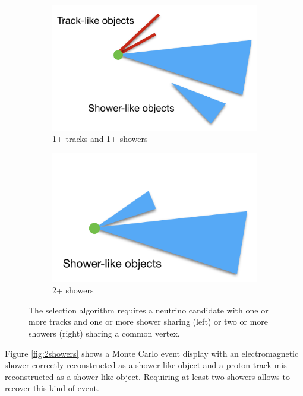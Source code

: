 \documentclass[a4paper]{article}
\begin{document}
\begin{figure}
\centering
  \begin{subfigure}{0.4\textwidth}
    \includegraphics[width=\linewidth]{figures/trsh.png}
    \caption{1+ tracks and 1+ showers} 
  \end{subfigure}
    \begin{subfigure}{0.4\textwidth}
    \includegraphics[width=\linewidth]{figures/sh.png}
    \caption{2+ showers} 
  \end{subfigure}
  \caption{The selection algorithm requires a neutrino candidate with one or more tracks and one or more shower sharing (left) or two or more showers (right) sharing  a common vertex.}\label{fig:dia}
\end{figure}

Figure \ref{fig:2showers} shows a Monte Carlo event display with an electromagnetic shower correctly reconstructed as a shower-like object and a proton track mis-reconstructed as a shower-like object. Requiring at least two showers allows to recover this kind of event.
\end{document}
